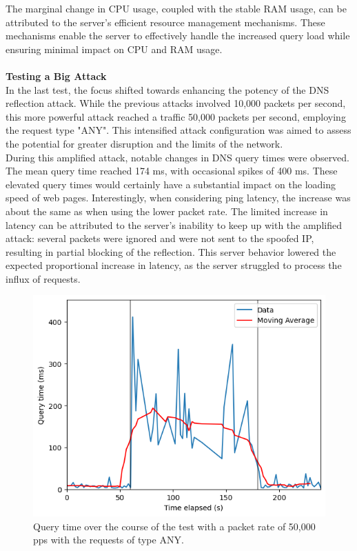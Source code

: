 \noindent The marginal change in CPU usage, coupled with the stable RAM usage, can be attributed to the server's efficient resource management mechanisms. These mechanisms enable the server to effectively handle the increased query load while ensuring minimal impact on CPU and RAM usage.\\
\\
\noindent \textbf{Testing a Big Attack}\\
\noindent In the last test, the focus shifted towards enhancing the potency of the DNS reflection attack. While the previous attacks involved 10,000 packets per second, this more powerful attack reached a traffic 50,000 packets per second, employing the request type "ANY". This intensified attack configuration was aimed to assess the potential for greater disruption and the limits of the network.\\
During this amplified attack, notable changes in DNS query times were observed. The mean query time reached 174 ms, with occasional spikes of 400 ms. These elevated query times would certainly have a substantial impact on the loading speed of web pages. Interestingly, when considering ping latency, the increase was about the same as when using the lower packet rate. The limited increase in latency can be attributed to the server's inability to keep up with the amplified attack: several packets were ignored and were not sent to the spoofed IP, resulting in partial blocking of the reflection. This server behavior lowered the expected proportional increase in latency, as the server struggled to process the influx of requests.\\
\begin{figure}[H]
    \centering
    \includegraphics[width=\columnwidth]{Sections/Images/Query_MA_ANY50.png}
    \caption{Query time over the course of the test with a packet rate of 50,000 pps with the requests of type ANY.}
    \label{fig:Query_MA_ANY50}
\end{figure}
